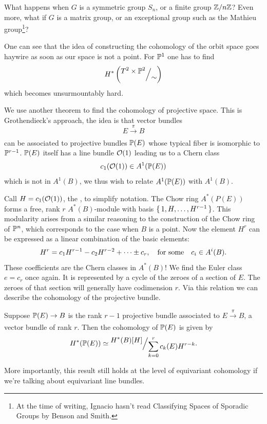\documentclass[12pt]{memoir}
\begin{document}
\begin{Qn}
    What happens when $G$ is a symmetric group $S_n$, or a finite group $\mathbb{Z}/n\mathbb{Z}$? Even more, what if $G$ is a matrix group, or an exceptional group such as the Mathieu group\footnote{At the time of writing, Ignacio hasn't read Classifying Spaces of Sporadic Groups by Benson and Smith.}?  
\end{Qn}

\begin{Rmk}
    One can see that the idea of constructing the cohomology of the orbit space goes haywire as soon as our space is not a point. For $\mathbb{P}^1$ one has to find
    $$H^\ast\left(\quot{T^2\x\bP^2}{\sim}\right)$$
    which becomes unsurmountably hard.
\end{Rmk}

We use another theorem to find the cohomology of projective space. This is Grothendieck's approach, the idea is that vector bundles 
$$E\xrightarrow[]{\pi}B$$
can be associated to projective bundles $\mathbb{P}(E)$ whose typical fiber is isomorphic to $\mathbb{P}^{r-1}$. $\mathbb{P}(E)$ itself has a line bundle $\mathcal{O}(1)$ leading us to a Chern class
$$c_1(\mathcal{O}(1))\in A^1(\mathbb{P}(E))$$
which is not in $A^1(B)$, we thus wish to relate $A^1(\mathbb{P}(E))$ with $A^1(B)$.\par
Call $H=c_1(\mathcal{O}(1))$, the , to simplify notation. The Chow ring $A^\ast(P(E))$ forms a free, rank $r$ $A^\ast(B)$-module with basis $\{\,1,H,\dots,H^{r-1}\,\}$. This modularity arises from a similar reasoning to the construction of the Chow ring of $\mathbb{P}^n$, which corresponds to the case when $B$ is a point. Now the element $H^r$ can be expressed as a linear combination of the basic elements: 
$$H^r=c_1H^{r-1}-c_2H^{r-2}+\dots\pm c_r,\quad\text{for some}\quad c_i\in A^i(B).$$
These coefficients are the Chern classes in $A^\ast(B)$! We find the Euler class $e=c_r$ once again. It is represented by a cycle of the zeroes of a section of $E$. The zeroes of that section will generally have codimension $r$. Via this relation we can describe the cohomology of the projective bundle.

\begin{Th}
    Suppose $\mathbb{P}(E)\to B$ is the rank $r-1$ projective bundle associated to $E\xrightarrow[]{\pi}B$, a vector bundle of rank $r$. Then the cohomology of $\mathbb{P}(E)$ is given by
    $$H^\ast(\bP(E))\isom\quot{H^\ast(B)[H]}{\sum_{k=0}^{r}c_k(E)H^{r-k}}.$$
\end{Th}
More importantly, this result still holds at the level of equivariant cohomology if we're talking about equivariant line bundles.
\end{document}
